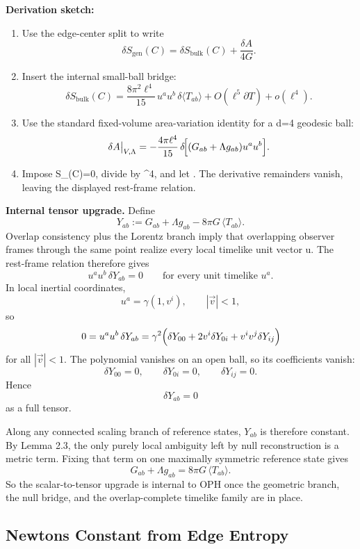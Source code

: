 \textbf{Derivation sketch:}

\begin{enumerate}
\def\labelenumi{\arabic{enumi}.}
\item
Use the edge-center split to write
\[
\delta S_{\mathrm{gen}}(C)
=
\delta S_{\mathrm{bulk}}(C)+\frac{\delta A}{4G}.
\]
\item
Insert the internal small-ball bridge:
\[
\delta S_{\mathrm{bulk}}(C)
=
\frac{8\pi^2\ell^4}{15}\,u^a u^b\,\delta\langle T_{ab}\rangle
+O(\ell^5\partial T)+o(\ell^4).
\]
\item
Use the standard fixed-volume area-variation identity for a d=4 geodesic ball:
\[
\delta A\big|_{V,\Lambda}
=
-\frac{4\pi\ell^4}{15}\,
\delta\!\Bigl[(G_{ab}+\Lambda g_{ab})u^a u^b\Bigr].
\]
\item
Impose \delta S_{}(C)=0, divide by \ell^4, and let \ell{}. The derivative remainders vanish, leaving the displayed rest-frame relation.
\end{enumerate}

\textbf{Internal tensor upgrade.} Define
\[
Y_{ab}:=G_{ab}+\Lambda g_{ab}-8\pi G\,\langle T_{ab}\rangle.
\]
Overlap consistency plus the Lorentz branch imply that overlapping observer frames through the same point realize every local timelike unit vector u. The rest-frame relation therefore gives
\[
u^a u^b\,\delta Y_{ab}=0
\qquad
\text{for every unit timelike }u^a.
\]
In local inertial coordinates,
\[
u^a=\gamma(1,v^i),
\qquad
|\vec v|<1,
\]
so
\[
0
=
u^a u^b\,\delta Y_{ab}
=
\gamma^2\Bigl(\delta Y_{00}+2v^i\delta Y_{0i}+v^iv^j\delta Y_{ij}\Bigr)
\]
for all \(|\vec v|<1\). The polynomial vanishes on an open ball, so its coefficients vanish:
\[
\delta Y_{00}=0,\qquad
\delta Y_{0i}=0,\qquad
\delta Y_{ij}=0.
\]
Hence
\[
\delta Y_{ab}=0
\]
as a full tensor.

Along any connected scaling branch of reference states, \(Y_{ab}\) is therefore constant. By Lemma 2.3, the only purely local ambiguity left by null reconstruction is a metric term. Fixing that term on one maximally symmetric reference state gives
\[
G_{ab}+\Lambda g_{ab}=8\pi G\,\langle T_{ab}\rangle.
\]
So the scalar-to-tensor upgrade is internal to OPH once the geometric branch, the null bridge, and the overlap-complete timelike family are in place.

\subsection{Newton\textquotesingle s Constant from Edge Entropy}\label{26-newtons-constant-from-edge-entropy}

